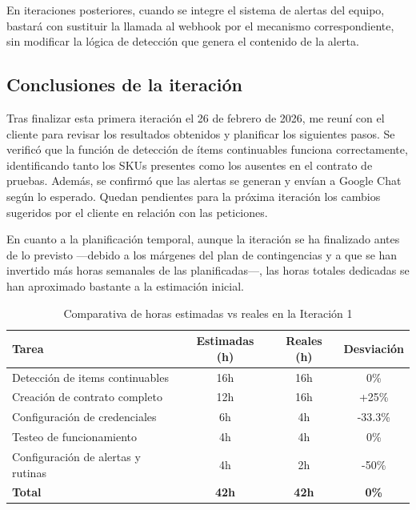 En iteraciones posteriores, cuando se integre el sistema de alertas del equipo, bastará con sustituir la llamada al webhook por el mecanismo correspondiente, sin modificar la lógica de detección que genera el contenido de la alerta.

\subsection{Conclusiones de la iteración}

Tras finalizar esta primera iteración el 26 de febrero de 2026, me reuní con el cliente para revisar los resultados obtenidos y planificar los siguientes pasos. Se verificó que la función de detección de ítems continuables funciona correctamente, identificando tanto los SKUs presentes como los ausentes en el contrato de pruebas. Además, se confirmó que las alertas se generan y envían a Google Chat según lo esperado. Quedan pendientes para la próxima iteración los cambios sugeridos por el cliente en relación con las peticiones.

En cuanto a la planificación temporal, aunque la iteración se ha finalizado antes de lo previsto ---debido a los márgenes del plan de contingencias y a que se han invertido más horas semanales de las planificadas---, las horas totales dedicadas se han aproximado bastante a la estimación inicial. 

\begin{table}[H]
    \centering
    \begin{tabular}{|l|c|c|c|}
        \hline
        \textbf{Tarea} & \textbf{Estimadas (h)} & \textbf{Reales (h)} & \textbf{Desviación}\\ 
        \hline
        Detección de items continuables & 16h & 16h & 0\% \\
        Creación de contrato completo & 12h & 16h & +25\% \\
        Configuración de credenciales & 6h & 4h & -33.3\% \\
        Testeo de funcionamiento & 4h & 4h & 0\% \\
        Configuración de alertas y rutinas & 4h & 2h & -50\% \\
        \hline
        \textbf{Total} & \textbf{42h} & \textbf{42h} & \textbf{0\%} \\
        \hline
    \end{tabular}
    \caption{Comparativa de horas estimadas vs reales en la Iteración 1}
    \label{tab:horas-iteracion1}
\end{table}


